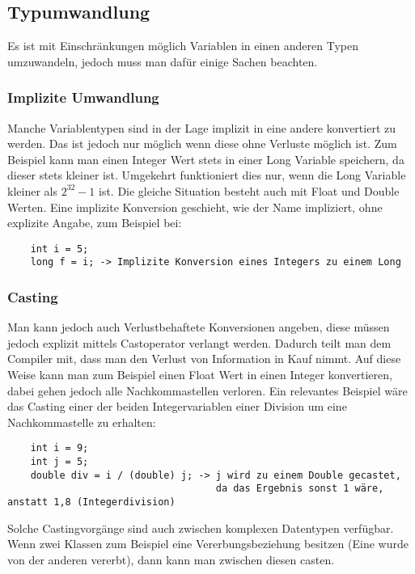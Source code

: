 \documentclass{article}
\begin{document}
	\subsection{Typumwandlung}
	Es ist mit Einschränkungen möglich Variablen in einen anderen Typen umzuwandeln, jedoch muss man dafür einige Sachen beachten.
	\subsubsection{Implizite Umwandlung}
	Manche Variablentypen sind in der Lage implizit in eine andere konvertiert zu werden. Das ist jedoch nur möglich wenn diese ohne Verluste möglich ist. Zum Beispiel kann man einen Integer Wert stets in einer Long Variable speichern, da dieser stets kleiner ist. Umgekehrt funktioniert dies nur, wenn die Long Variable kleiner als $2^{32}-1$ ist. Die gleiche Situation besteht auch mit Float und Double Werten. Eine implizite Konversion geschieht, wie der Name impliziert, ohne explizite Angabe, zum Beispiel bei: \begin{verbatim}
	int i = 5;
	long f = i; -> Implizite Konversion eines Integers zu einem Long
	\end{verbatim}
	\subsubsection{Casting}
	Man kann jedoch auch Verlustbehaftete Konversionen angeben, diese müssen jedoch explizit mittels Castoperator verlangt werden. Dadurch teilt man dem Compiler mit, dass man den Verlust von Information in Kauf nimmt. Auf diese Weise kann man zum Beispiel einen Float Wert in einen Integer konvertieren, dabei gehen jedoch alle Nachkommastellen verloren. Ein relevantes Beispiel wäre das Casting einer der beiden Integervariablen einer Division um eine Nachkommastelle zu erhalten:
	\begin{verbatim}
	int i = 9;
	int j = 5;
	double div = i / (double) j; -> j wird zu einem Double gecastet, 
	                                da das Ergebnis sonst 1 wäre, anstatt 1,8 (Integerdivision)
	\end{verbatim}
	Solche Castingvorgänge sind auch zwischen komplexen Datentypen verfügbar. Wenn zwei Klassen zum Beispiel eine Vererbungsbeziehung besitzen (Eine wurde von der anderen vererbt), dann kann man zwischen diesen casten.
\end{document}
